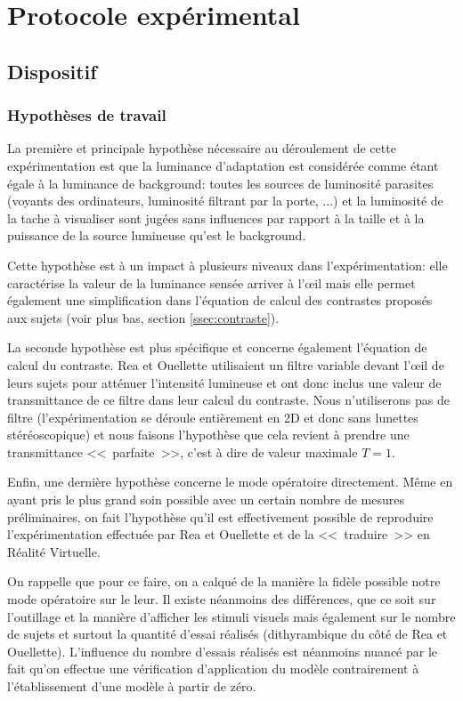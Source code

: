 \chapter{Protocole expérimental}
	\section{Dispositif}
	\subsection{Hypothèses de travail}
	\label{ssec:hyp_travail}
	\par La première et principale hypothèse nécessaire au déroulement de cette expérimentation est que la luminance d'adaptation est considérée comme étant égale à la luminance de background: toutes les sources de luminosité parasites (voyants des ordinateurs, luminosité filtrant par la porte, ...) et la luminosité de la tache à visualiser sont jugées sans influences par rapport à la taille et à la puissance de la source lumineuse qu'est le background.
	
	\par Cette hypothèse est à un impact à plusieurs niveaux dans l'expérimentation: elle caractérise la valeur de la luminance sensée arriver à l'œil mais elle permet également une simplification dans l'équation de calcul des contrastes proposés aux sujets (voir plus bas, section \ref{ssec:contraste}).
	
	\par La seconde hypothèse est plus spécifique et concerne également l'équation de calcul du contraste. Rea et Ouellette utilisaient un filtre variable devant l'œil de leurs sujets pour atténuer l'intensité lumineuse et ont donc inclus une valeur de transmittance de ce filtre dans leur calcul du contraste. Nous n'utiliserons pas de filtre (l'expérimentation se déroule entièrement en 2D et donc sans lunettes stéréoscopique) et nous faisons l'hypothèse que cela revient à prendre une transmittance <<~parfaite~>>, c'est à dire de valeur maximale $T = 1$.
	
	\par Enfin, une dernière hypothèse concerne le mode opératoire directement. Même en ayant pris le plus grand soin possible avec un certain nombre de mesures préliminaires, on fait l'hypothèse qu'il est effectivement possible de reproduire l'expérimentation effectuée par Rea et Ouellette et de la <<~traduire~>> en Réalité Virtuelle.
	
	\par On rappelle que pour ce faire, on a calqué de la manière la fidèle possible notre mode opératoire sur le leur. Il existe néanmoins des différences, que ce soit sur l'outillage et la manière d'afficher les stimuli visuels mais également sur le nombre de sujets et surtout la quantité d'essai réalisés (dithyrambique du côté de Rea et Ouellette). L'influence du nombre d'essais réalisés est néanmoins nuancé par le fait qu'on effectue une vérification d'application du modèle contrairement à l'établissement d'une modèle à partir de zéro.
	
